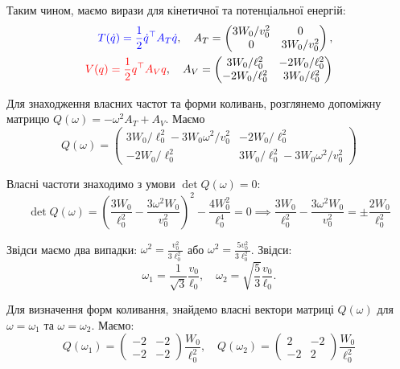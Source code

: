 \documentclass{hw_template}
\begin{document}
Таким чином, маємо вирази для кінетичної та потенціальної енергій:
\begin{align*}
    \textcolor{blue}{T(\dot{q}) = \frac{1}{2}\dot{q}^{\top}A_T\dot{q}}, \quad A_T = \begin{pmatrix}
        3W_0/v_0^2 & 0 \\
        0 & 3W_0/v_0^2
    \end{pmatrix}, \\
    \textcolor{red}{V(q) = \frac{1}{2}q^{\top}A_V q}, \quad A_V = \begin{pmatrix}
        3W_0/\ell_0^2 & -2W_0/\ell_0^2 \\
        -2W_0/\ell_0^2 & 3W_0/\ell_0^2
    \end{pmatrix}
\end{align*}

Для знаходження власних частот та форми коливань, розглянемо допоміжну матрицю
$Q(\omega) = -\omega^2A_T + A_V$. Маємо
\begin{equation*}
    Q(\omega) = \begin{pmatrix}
        3W_0/\ell_0^2 - 3W_0\omega^2/v_0^2 & -2W_0/\ell_0^2 \\
        -2W_0/\ell_0^2 & 3W_0/\ell_0^2 - 3W_0\omega^2/v_0^2
    \end{pmatrix}
\end{equation*}

Власні частоти знаходимо з умови $\det Q(\omega) = 0$: 
\begin{equation*}
    \det Q(\omega) = \left(\frac{3W_0}{\ell_0^2} - \frac{3\omega^2W_0}{v_0^2}\right)^2 - \frac{4W_0^2}{\ell_0^4} = 0 \implies \frac{3W_0}{\ell_0^2} - \frac{3\omega^2W_0}{v_0^2} = \pm \frac{2W_0}{\ell_0^2}
\end{equation*}

Звідси маємо два випадки: $\omega^2=\frac{v_0^2}{3\ell_0^2}$ або $\omega^2 = \frac{5v_0^2}{3\ell_0^2}$. Звідси:
\begin{equation*}
    \omega_1 = \frac{1}{\sqrt{3}}\frac{v_0}{\ell_0}, \quad \omega_2 = \sqrt{\frac{5}{3}} \frac{v_0}{\ell_0}.
\end{equation*}

Для визначення форм коливання, знайдемо власні вектори матриці $Q(\omega)$ для
$\omega=\omega_1$ та $\omega=\omega_2$. Маємо:
\begin{equation*}
    Q(\omega_1) = \begin{pmatrix}
        -2 & -2 \\
        -2 & -2
    \end{pmatrix}\frac{W_0}{\ell_0^2}, \quad Q(\omega_2) = \begin{pmatrix}
        2 & -2 \\
        -2 & 2
    \end{pmatrix}\frac{W_0}{\ell_0^2}
\end{equation*}
\end{document}
